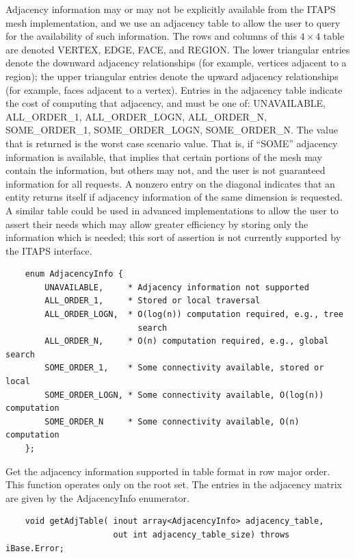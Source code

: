 \documentclass{article}
\begin{document}
Adjacency information may or may not be explicitly available 
from the ITAPS mesh implementation, and we use an adjacency table 
to allow the user to query for the availability of such information. 
The rows and columns of this $4 \times 4$ table are denoted VERTEX, EDGE, 
FACE, and REGION. The lower triangular entries denote the downward 
adjacency relationships (for example, vertices adjacent to a 
region); the upper triangular entries denote the upward adjacency 
relationships (for example, faces adjacent to a vertex). Entries 
in the adjacency table indicate the cost of computing that adjacency, 
and must be one of: UNAVAILABLE, ALL\_ORDER\_1, ALL\_ORDER\_LOGN, 
ALL\_ORDER\_N, SOME\_ORDER\_1, SOME\_ORDER\_LOGN, SOME\_ORDER\_N. The 
value that is returned is the worst case scenario value. That 
is, if ``SOME'' adjacency information is available, that implies 
that certain portions of the mesh may contain the information, 
but others may not, and the user is not guaranteed information 
for all requests. A nonzero entry on the diagonal indicates that 
an entity returns itself if adjacency information of the same 
dimension is requested. A similar table could be used in advanced 
implementations to allow the user to assert their needs which 
may allow greater efficiency by storing only the information 
which is needed; this sort of assertion is not currently supported 
by the ITAPS interface. 


\begin{verbatim}
    enum AdjacencyInfo {  
        UNAVAILABLE,     * Adjacency information not supported  
        ALL_ORDER_1,     * Stored or local traversal  
        ALL_ORDER_LOGN,  * O(log(n)) computation required, e.g., tree 
                           search  
        ALL_ORDER_N,     * O(n) computation required, e.g., global search 
        SOME_ORDER_1,    * Some connectivity available, stored or local 
        SOME_ORDER_LOGN, * Some connectivity available, O(log(n)) computation 
        SOME_ORDER_N     * Some connectivity available, O(n) computation 
    };
\end{verbatim}

Get the adjacency information supported in table format in row 
major order. This function operates only on the root set. The 
entries in the adjacency matrix are given by the AdjacencyInfo 
enumerator.

\begin{verbatim}
    void getAdjTable( inout array<AdjacencyInfo> adjacency_table,  
                      out int adjacency_table_size) throws iBase.Error;
\end{verbatim}
\end{document}
